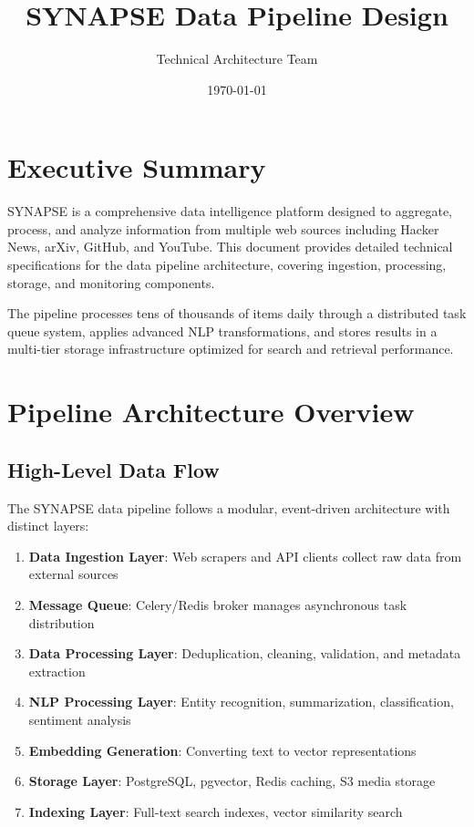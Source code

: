 \documentclass[12pt,a4paper]{report}
\title{SYNAPSE Data Pipeline Design}
\author{Technical Architecture Team}
\date{\today}
\begin{document}
\maketitle

\tableofcontents
\newpage

\chapter{Executive Summary}

SYNAPSE is a comprehensive data intelligence platform designed to aggregate, process, and analyze information from multiple web sources including Hacker News, arXiv, GitHub, and YouTube. This document provides detailed technical specifications for the data pipeline architecture, covering ingestion, processing, storage, and monitoring components.

The pipeline processes tens of thousands of items daily through a distributed task queue system, applies advanced NLP transformations, and stores results in a multi-tier storage infrastructure optimized for search and retrieval performance.

\chapter{Pipeline Architecture Overview}

\section{High-Level Data Flow}

The SYNAPSE data pipeline follows a modular, event-driven architecture with distinct layers:

\begin{enumerate}
    \item \textbf{Data Ingestion Layer}: Web scrapers and API clients collect raw data from external sources
    \item \textbf{Message Queue}: Celery/Redis broker manages asynchronous task distribution
    \item \textbf{Data Processing Layer}: Deduplication, cleaning, validation, and metadata extraction
    \item \textbf{NLP Processing Layer}: Entity recognition, summarization, classification, sentiment analysis
    \item \textbf{Embedding Generation}: Converting text to vector representations
    \item \textbf{Storage Layer}: PostgreSQL, pgvector, Redis caching, S3 media storage
    \item \textbf{Indexing Layer}: Full-text search indexes, vector similarity search
\end{enumerate}
\end{document}
